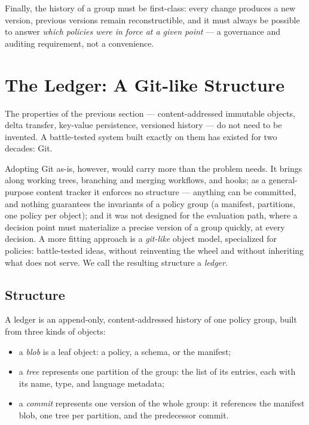 \documentclass[11pt,a4paper]{article}
\newcommand{\term}[1]{\emph{#1}}                 %
\begin{document}
Finally, the history of a group must be first-class: every change
produces a new version, previous versions remain reconstructible, and it
must always be possible to answer \emph{which policies were in force at a
given point} --- a governance and auditing requirement, not a
convenience.

\section{The Ledger: A Git-like Structure}

The properties of the previous section --- content-addressed immutable
objects, delta transfer, key-value persistence, versioned history --- do
not need to be invented. A battle-tested system built exactly on them has
existed for two decades: Git.

Adopting Git as-is, however, would carry more than the problem needs. It
brings along working trees, branching and merging workflows, and hooks;
as a general-purpose content tracker it enforces no structure --- anything
can be committed, and nothing guarantees the invariants of a policy group
(a manifest, partitions, one policy per object); and it was not designed
for the evaluation path, where a decision point must materialize a
precise version of a group quickly, at every decision. A more fitting
approach is a \term{git-like} object model, specialized for policies:
battle-tested ideas, without reinventing the wheel and without inheriting
what does not serve. We call the resulting structure a \term{ledger}.

\subsection{Structure}

A ledger is an append-only, content-addressed history of one policy
group, built from three kinds of objects:

\begin{itemize}[nosep]
  \item a \term{blob} is a leaf object: a policy, a schema, or the
        manifest;
  \item a \term{tree} represents one partition of the group: the list of
        its entries, each with its name, type, and language metadata;
  \item a \term{commit} represents one version of the whole group: it
        references the manifest blob, one tree per partition, and the
        predecessor commit.
\end{itemize}
\end{document}
